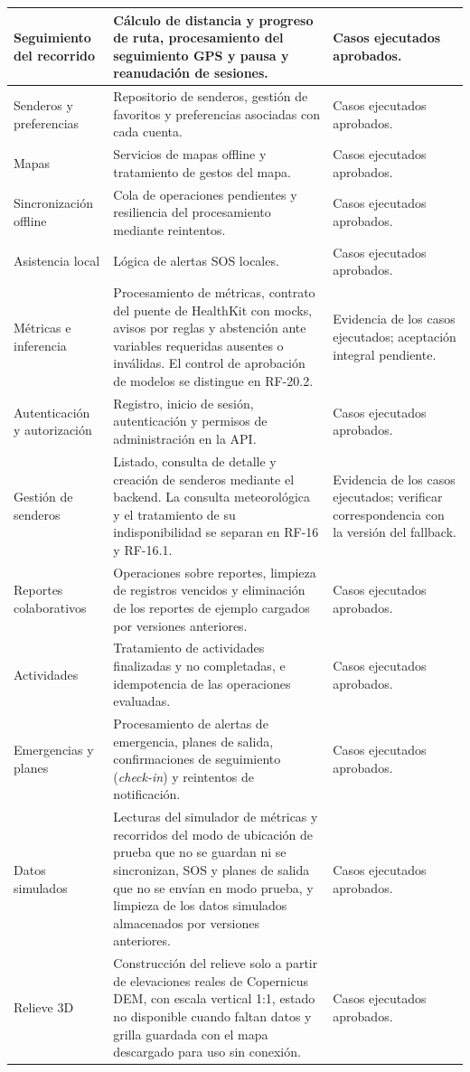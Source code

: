 \begin{longtable}{|p{3cm}|p{7.8cm}|p{3.4cm}|}
    Seguimiento del recorrido & Cálculo de distancia y progreso de ruta, procesamiento del seguimiento GPS y pausa y reanudación de sesiones. & Casos ejecutados aprobados. \\
    \hline
    Senderos y preferencias & Repositorio de senderos, gestión de favoritos y preferencias asociadas con cada cuenta. & Casos ejecutados aprobados. \\
    \hline
    Mapas & Servicios de mapas offline y tratamiento de gestos del mapa. & Casos ejecutados aprobados. \\
    \hline
    Sincronización offline & Cola de operaciones pendientes y resiliencia del procesamiento mediante reintentos. & Casos ejecutados aprobados. \\
    \hline
    Asistencia local & Lógica de alertas SOS locales. & Casos ejecutados aprobados. \\
    \hline
    Métricas e inferencia & Procesamiento de métricas, contrato del puente de HealthKit con mocks, avisos por reglas y abstención ante variables requeridas ausentes o inválidas. El control de aprobación de modelos se distingue en RF-20.2. & Evidencia de los casos ejecutados; aceptación integral pendiente. \\
    \hline
    Autenticación y autorización & Registro, inicio de sesión, autenticación y permisos de administración en la API. & Casos ejecutados aprobados. \\
    \hline
    Gestión de senderos & Listado, consulta de detalle y creación de senderos mediante el backend. La consulta meteorológica y el tratamiento de su indisponibilidad se separan en RF-16 y RF-16.1. & Evidencia de los casos ejecutados; verificar correspondencia con la versión del fallback. \\
    \hline
    Reportes colaborativos & Operaciones sobre reportes, limpieza de registros vencidos y eliminación de los reportes de ejemplo cargados por versiones anteriores. & Casos ejecutados aprobados. \\
    \hline
    Actividades & Tratamiento de actividades finalizadas y no completadas, e idempotencia de las operaciones evaluadas. & Casos ejecutados aprobados. \\
    \hline
    Emergencias y planes & Procesamiento de alertas de emergencia, planes de salida, confirmaciones de seguimiento (\emph{check-in}) y reintentos de notificación. & Casos ejecutados aprobados. \\
    \hline
    Datos simulados & Lecturas del simulador de métricas y recorridos del modo de ubicación de prueba que no se guardan ni se sincronizan, SOS y planes de salida que no se envían en modo prueba, y limpieza de los datos simulados almacenados por versiones anteriores. & Casos ejecutados aprobados. \\
    \hline
    Relieve 3D & Construcción del relieve solo a partir de elevaciones reales de Copernicus DEM, con escala vertical 1:1, estado no disponible cuando faltan datos y grilla guardada con el mapa descargado para uso sin conexión. & Casos ejecutados aprobados. \\
    \hline
\end{longtable}
\endgroup


